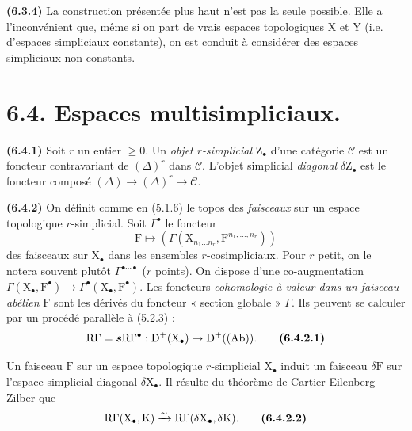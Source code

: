 \documentclass[11pt,leqno]{article}
\begin{document}
\textbf{(6.3.4)} La construction présentée plus haut n’est pas la seule possible. Elle a l’inconvénient que, même si on part de vrais espaces topologiques \(\mathrm{X}\) et \(\mathrm{Y}\) (i.e. d’espaces simpliciaux constants), on est conduit à considérer des espaces simpliciaux non constants.

\section*{6.4. Espaces multisimpliciaux.}

\textbf{(6.4.1)} Soit \(r\) un entier \(\geq 0\). Un \textit{objet \(r\)-simplicial} \(\mathrm{Z}_{\bullet}\) d’une catégorie \(\mathscr{C}\) est un foncteur contravariant de \((\Delta)^r\) dans \(\mathscr{C}\). L’objet simplicial \textit{diagonal} \(\delta\mathrm{Z}_{\bullet}\) est le foncteur composé \((\Delta)\to(\Delta)^r\to\mathscr{C}\).

\textbf{(6.4.2)} On définit comme en (5.1.6) le topos des \textit{faisceaux} sur un espace topologique \(r\)-simplicial. Soit \(\Gamma^{\bullet}\) le foncteur
\[
\mathrm{F}\mapsto
(\Gamma(\mathrm{X}_{n_1\ldots n_r},\mathrm{F}^{n_1,\ldots,n_r}))
\]
des faisceaux sur \(\mathrm{X}_{\bullet}\) dans les ensembles \(r\)-cosimpliciaux. Pour \(r\) petit, on le notera souvent plutôt \(\Gamma^{\bullet\cdots\bullet}\) (\(r\) points). On dispose d’une co-augmentation \(\Gamma(\mathrm{X}_{\bullet},\mathrm{F}^{\bullet})\to\Gamma^{\bullet}(\mathrm{X}_{\bullet},\mathrm{F}^{\bullet})\). Les foncteurs \textit{cohomologie à valeur dans un faisceau abélien} \(\mathrm{F}\) sont les dérivés du foncteur « section globale » \(\Gamma\). Ils peuvent se calculer par un procédé parallèle à (5.2.3) :
\[
\mathrm{R}\Gamma=\boldsymbol{s}\mathrm{R}\Gamma^{\bullet}:
\mathrm{D}^{+}(\mathrm{X}_{\bullet})\to\mathrm{D}^{+}((\mathrm{Ab})).
\tag*{\textbf{(6.4.2.1)}}
\]

Un faisceau \(\mathrm{F}\) sur un espace topologique \(r\)-simplicial \(\mathrm{X}_{\bullet}\) induit un faisceau \(\delta\mathrm{F}\) sur l’espace simplicial diagonal \(\delta\mathrm{X}_{\bullet}\). Il résulte du théorème de Cartier-Eilenberg-Zilber que
\[
\mathrm{R}\Gamma(\mathrm{X}_{\bullet},\mathrm{K})
\xrightarrow{\sim}
\mathrm{R}\Gamma(\delta\mathrm{X}_{\bullet},\delta\mathrm{K}).
\tag*{\textbf{(6.4.2.2)}}
\]
\end{document}
